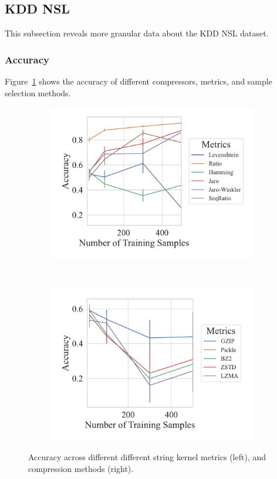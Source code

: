 \subsection{KDD NSL}
This subsection reveals more granular data about the KDD NSL dataset.

\subsubsection{Accuracy}
Figure~\ref{fig:kdd_nsl_accuracy} shows the accuracy of different compressors, metrics, and sample selection methods.

\begin{figure}[h!][h]
	\centering
    \captionsetup[subfigure]{skip=0pt}
	\begin{subfigure}[t]{.44\textwidth}
		\centering
		\includegraphics[width=\textwidth]{figs/kdd_nsl/string_metric_vs_accuracy.pdf}
	\end{subfigure}
	~
	\begin{subfigure}[t]{.44\textwidth}
		\centering
		\includegraphics[width=\textwidth]{figs/kdd_nsl/compressor_metric_vs_accuracy.pdf}
	\end{subfigure}
	\caption{Accuracy across different different string kernel metrics (left), and compression methods (right).}
	\label{fig:kdd_nsl_accuracy}
\end{figure}

